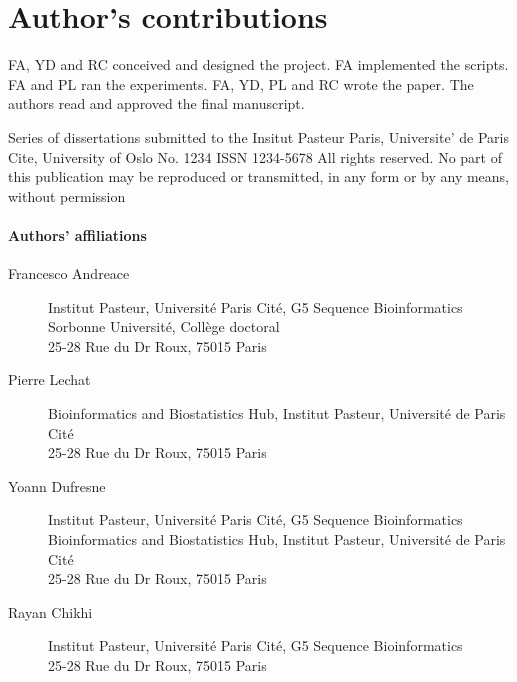 \section*{\textbf{Author's contributions}}
FA, YD and RC conceived and designed the project. FA implemented the scripts. FA and PL ran the experiments. FA, YD, PL and RC wrote the paper. The authors read and approved the final manuscript.


Series of dissertations submitted to the
Insitut Pasteur Paris, Universite’ de Paris Cite, University of Oslo
No. 1234
ISSN 1234-5678
All rights reserved. No part of this publication may be
reproduced or transmitted, in any form or by any means, without permission

\paragraph{Authors' affiliations}
\begin{description}
	\item[Francesco Andreace]
	Institut Pasteur, Université Paris Cité, G5 Sequence Bioinformatics \\
	Sorbonne Université, Collège doctoral \\
	25-28 Rue du Dr Roux, 75015 Paris
	
	
	\item[Pierre Lechat]
	Bioinformatics and Biostatistics Hub, Institut Pasteur, Université de Paris Cité \\
	25-28 Rue du Dr Roux, 75015 Paris
	
	\item[Yoann Dufresne]
	Institut Pasteur, Université Paris Cité, G5 Sequence Bioinformatics \\
	Bioinformatics and Biostatistics Hub, Institut Pasteur, Université de Paris Cité \\
	25-28 Rue du Dr Roux, 75015 Paris
	
	\item[Rayan Chikhi]
	Institut Pasteur, Université Paris Cité, G5 Sequence Bioinformatics \\
	25-28 Rue du Dr Roux, 75015 Paris
\end{description}
\newpage

